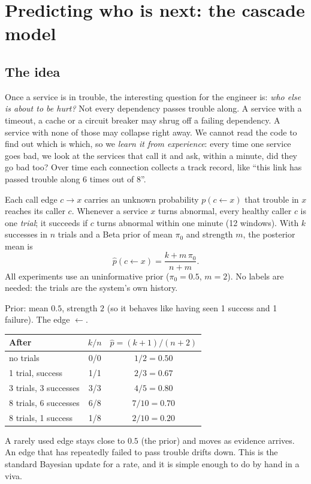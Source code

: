 \chapter{Predicting who is next: the cascade model}
\label{ch:cascade}

\section{The idea}
\begin{simplebox}
Once a service is in trouble, the interesting question for the engineer is: \emph{who else is about to be hurt?} Not every dependency passes trouble along. A service with a timeout, a cache or a circuit breaker may shrug off a failing dependency. A service with none of those may collapse right away. We cannot read the code to find out which is which, so we \emph{learn it from experience}: every time one service goes bad, we look at the services that call it and ask, within a minute, did they go bad too? Over time each connection collects a track record, like ``this link has passed trouble along 6 times out of 8''.
\end{simplebox}

\begin{techbox}
Each call edge $c\to x$ carries an unknown probability $p(c\leftarrow x)$ that trouble in $x$ reaches its caller $c$. Whenever a service $x$ turns abnormal, every healthy caller $c$ is one \emph{trial}; it succeeds if $c$ turns abnormal within one minute (12 windows). With $k$ successes in $n$ trials and a Beta prior of mean $\pi_0$ and strength $m$, the posterior mean is
\[
\hat p(c\leftarrow x)=\frac{k+m\,\pi_0}{n+m}.
\]
All experiments use an uninformative prior ($\pi_0=0.5$, $m=2$). No labels are needed: the trials are the system's own history.
\end{techbox}

\begin{examplebox}
Prior: mean $0.5$, strength $2$ (so it behaves like having seen 1 success and 1 failure). The edge $\leftarrow$.

\begin{center}
\small
\begin{tabular}{lcc}
\toprule
After & $k/n$ & $\hat p=(k+1)/(n+2)$\\
\midrule
no trials & 0/0 & $1/2=0.50$\\
1 trial, success & 1/1 & $2/3=0.67$\\
3 trials, 3 successes & 3/3 & $4/5=0.80$\\
8 trials, 6 successes & 6/8 & $7/10=0.70$\\
8 trials, 1 success & 1/8 & $2/10=0.20$\\
\bottomrule
\end{tabular}
\end{center}

A rarely used edge stays close to $0.5$ (the prior) and moves as evidence arrives. An edge that has repeatedly failed to pass trouble drifts down. This is the standard Bayesian update for a rate, and it is simple enough to do by hand in a viva.
\end{examplebox}

